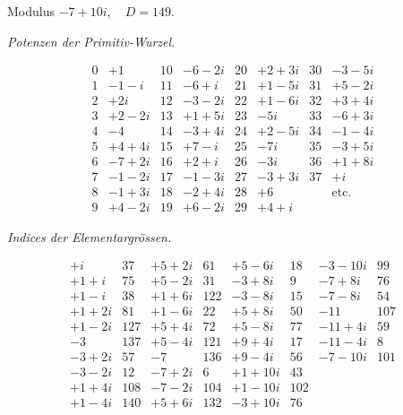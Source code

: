 \newenvironment{ResidueTable}[1]{\begingroup\small\setlength{\arraycolsep}{5pt}\renewcommand{\arraystretch}{1.12}\[\begin{array}{#1}}{\end{array}\]\endgroup}
\newcommand{\PowerTitle}{\begin{center}\textit{Potenzen der Primitiv-Wurzel.}\end{center}}
\newcommand{\IndexTitle}{\begin{center}\textit{Indices der Elementargrössen.}\end{center}}
\begin{center}Modulus $-7+10i,\quad D=149.$\end{center}
\PowerTitle
\begin{ResidueTable}{r|r||r|r||r|r||r|r}
0&+1&10&-6-2i&20&+2+3i&30&-3-5i\\
1&-1-i&11&-6+i&21&+1-5i&31&+5-2i\\
2&+2i&12&-3-2i&22&+1-6i&32&+3+4i\\
3&+2-2i&13&+1+5i&23&-5i&33&-6+3i\\
4&-4&14&-3+4i&24&+2-5i&34&-1-4i\\
5&+4+4i&15&+7-i&25&-7i&35&-3+5i\\
6&-7+2i&16&+2+i&26&-3i&36&+1+8i\\
7&-1-2i&17&-1-3i&27&-3+3i&37&+i\\
8&-1+3i&18&-2+4i&28&+6&&\text{etc.}\\
9&+4-2i&19&+6-2i&29&+4+i&&
\end{ResidueTable}
\IndexTitle
\begin{ResidueTable}{r|r||r|r||r|r||r|r}
+i&37&+5+2i&61&+5-6i&18&-3-10i&99\\
+1+i&75&+5-2i&31&-3+8i&9&-7+8i&76\\
+1-i&38&+1+6i&122&-3-8i&15&-7-8i&54\\
+1+2i&81&+1-6i&22&+5+8i&50&-11&107\\
+1-2i&127&+5+4i&72&+5-8i&77&-11+4i&59\\
-3&137&+5-4i&121&+9+4i&17&-11-4i&8\\
-3+2i&57&-7&136&+9-4i&56&-7-10i&101\\
-3-2i&12&-7+2i&6&+1+10i&43&&\\
+1+4i&108&-7-2i&104&+1-10i&102&&\\
+1-4i&140&+5+6i&132&-3+10i&76&&
\end{ResidueTable}
\clearpage

